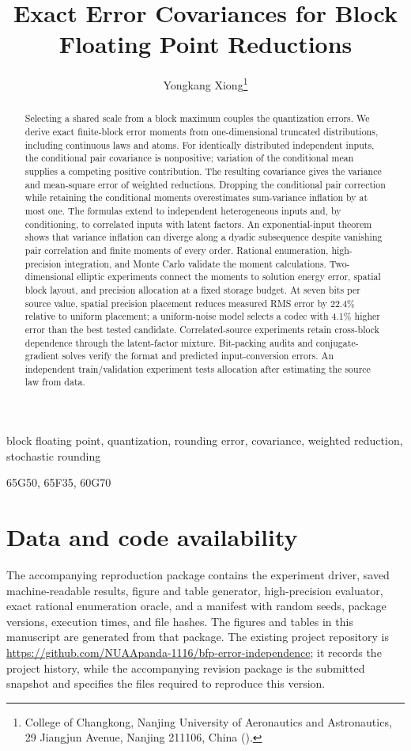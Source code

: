 \documentclass[review,hidelinks,letterpaper]{siamart251216}
\title{Exact Error Covariances for Block Floating Point Reductions}
\author{Yongkang Xiong\thanks{College of Changkong, Nanjing University of
Aeronautics and Astronautics, 29 Jiangjun Avenue, Nanjing 211106, China
(\email{nuaapanda@outlook.com}).}}
\begin{document}
\maketitle
\begin{abstract}
Selecting a shared scale from a block maximum couples the quantization errors.
We derive exact finite-block error moments from one-dimensional truncated
distributions, including continuous laws and atoms. For identically distributed
independent inputs, the conditional pair covariance is nonpositive;
variation of the conditional mean supplies a competing positive contribution.
The resulting covariance gives the variance and mean-square error of weighted
reductions. Dropping the conditional pair correction while retaining the
conditional moments overestimates sum-variance inflation by at most one.
The formulas extend to independent heterogeneous inputs and, by conditioning,
to correlated inputs with latent factors. An exponential-input theorem shows
that variance inflation can diverge along a dyadic subsequence despite
vanishing pair correlation and finite moments of every order.
Rational enumeration, high-precision integration, and Monte Carlo validate
the moment calculations. Two-dimensional elliptic experiments connect the
moments to solution energy error, spatial block layout, and precision allocation
at a fixed storage budget. At seven bits per source value, spatial precision
placement reduces measured RMS error by 22.4\% relative to uniform placement;
a uniform-noise model selects a codec with 4.1\% higher error than the best
tested candidate. Correlated-source experiments retain cross-block dependence
through the latent-factor mixture. Bit-packing audits and conjugate-gradient
solves verify the format and predicted input-conversion errors. An independent train/validation
experiment tests allocation after estimating the source law from data.
\end{abstract}
\begin{keywords}
block floating point, quantization, rounding error, covariance,
weighted reduction, stochastic rounding
\end{keywords}
\begin{AMS}
65G50, 65F35, 60G70
\end{AMS}





\section*{Data and code availability}
The accompanying reproduction package contains the experiment driver, saved
machine-readable results, figure and table generator, high-precision evaluator,
exact rational enumeration oracle, and a manifest with random seeds, package
versions, execution times, and file hashes. The figures and tables in this
manuscript are generated from that package. The existing project repository is
\url{https://github.com/NUAApanda-1116/bfp-error-independence}; it records the
project history, while the accompanying revision package is the submitted
snapshot and specifies the files required to reproduce this version.


\end{document}
